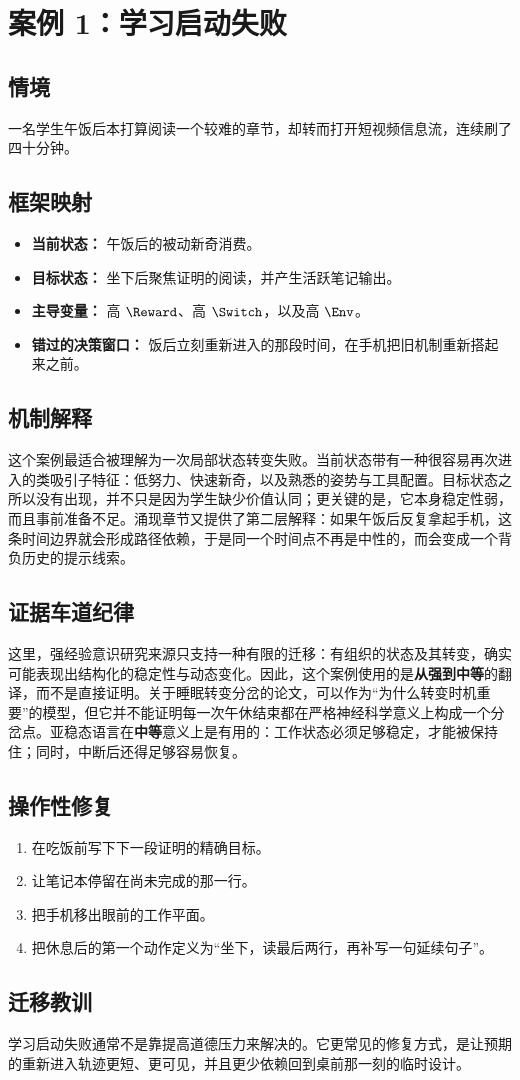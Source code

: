 \section{案例 1：学习启动失败}

\subsection*{情境}
一名学生午饭后本打算阅读一个较难的章节，却转而打开短视频信息流，连续刷了四十分钟。

\subsection*{框架映射}
\begin{itemize}[nosep]
  \item \textbf{当前状态：} 午饭后的被动新奇消费。
  \item \textbf{目标状态：} 坐下后聚焦证明的阅读，并产生活跃笔记输出。
  \item \textbf{主导变量：} 高 $\Reward$、高 $\Switch$，以及高 $\Env$。
  \item \textbf{错过的决策窗口：} 饭后立刻重新进入的那段时间，在手机把旧机制重新搭起来之前。
\end{itemize}

\subsection*{机制解释}
这个案例最适合被理解为一次局部状态转变失败。当前状态带有一种很容易再次进入的类吸引子特征：低努力、快速新奇，以及熟悉的姿势与工具配置。目标状态之所以没有出现，并不只是因为学生缺少价值认同；更关键的是，它本身稳定性弱，而且事前准备不足。涌现章节又提供了第二层解释：如果午饭后反复拿起手机，这条时间边界就会形成路径依赖，于是同一个时间点不再是中性的，而会变成一个背负历史的提示线索。

\subsection*{证据车道纪律}
这里，强经验意识研究来源只支持一种有限的迁移：有组织的状态及其转变，确实可能表现出结构化的稳定性与动态变化。因此，这个案例使用的是\textbf{从强到中等}的翻译，而不是直接证明。关于睡眠转变分岔的论文，可以作为“为什么转变时机重要”的模型，但它并不能证明每一次午休结束都在严格神经科学意义上构成一个分岔点。亚稳态语言在\textbf{中等}意义上是有用的：工作状态必须足够稳定，才能被保持住；同时，中断后还得足够容易恢复。

\subsection*{操作性修复}
\begin{enumerate}[nosep]
  \item 在吃饭前写下下一段证明的精确目标。
  \item 让笔记本停留在尚未完成的那一行。
  \item 把手机移出眼前的工作平面。
  \item 把休息后的第一个动作定义为“坐下，读最后两行，再补写一句延续句子”。
\end{enumerate}

\subsection*{迁移教训}
学习启动失败通常不是靠提高道德压力来解决的。它更常见的修复方式，是让预期的重新进入轨迹更短、更可见，并且更少依赖回到桌前那一刻的临时设计。
